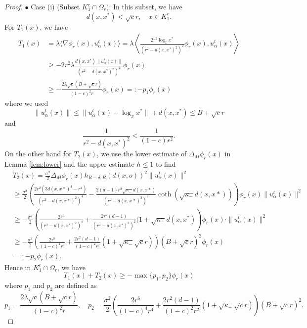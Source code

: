 \documentclass[10pt,a4paper]{amsart}
\newcommand{\dist}{d}%
\newcommand{\p}{o}%
\begin{document}
\begin{proof}
\noindent $\bullet$ Case (i) (Subset $K_1^c \cap \Omega_r)$: In this subset, we have
\[
d(x,x^*)<\sqrt c r,\quad x\in K_1^c.
\]
For $T_1(x)$, we have
\begin{align*}
T_1(x)  & =  \lambda   \langle  \nabla \phi_r(x), u_\alpha^t(x) \rangle = \lambda \left\langle  \frac{2r^2 \log_xx^*}{ (r^2- d(x,x^*)^2)^2} \phi_r(x), u_\alpha^t(x)\right\rangle \\
& \geq -2r^2 \lambda \frac{  d(x,x^*) \|u_\alpha^t(x)\|      } {      (r^2- d(x,x^*)^2)^2   }  \phi_r(x)   \\
& \geq -\frac{ 2\lambda\sqrt c (B+\sqrt cr)}{(1-c)^2r} \phi_r(x) =: -p_1 \phi_r(x)
\end{align*}
where we used
\[
\|u_\alpha^t(x) \| \leq \| u_\alpha^t(x) - \log_xx^*\| + d(x,x^*) \leq B + \sqrt cr
\]
and
\[
\frac{1}{ r^2- d(x,x^*)^2  } <\frac{1}{(1-c)r^2}.
\]
On the other hand for $T_2(x)$,  we use the lower estimate of $\Delta_M \phi_r(x)$ in Lemma \ref{lem:lower} and the upper estimate  $h\leq1$ to find
\begin{align*}
&T_2(x)  = \frac{\sigma^2}{2}\Delta_M \phi_r(x)  h_{R-\delta,R}\left(\dist(x, \p)\right)^2 \|u_\alpha^t(x)\|^2 \\
& \geq \frac{\sigma^2}{2} \left(  \frac{2r^2(3d(x,x*)^4 - r^4)}{(r^2 - d(x,x*)^2)^4} - \frac{   2(d-1)r^2\sqrt{\kappa_-}d(x,x*)  }{(r^2 - d(x,x*)^2)^2}  \coth(\sqrt{\kappa_-} d(x,x*))\right) \phi_r(x) \|u_\alpha^t(x)\|^2 \\
&\geq -\frac{\sigma^2}{2}  \left(  \frac{2r^6}{ (r^2 - d(x,x^*)^2)^4} + \frac{2r^2 (d-1)}{ (r^2 - d(x,x^*)^2)^2} (1+\sqrt{\kappa_-}d(x,x^*)     \right) \phi_r(x) \cdot   \|u_\alpha^t(x)\|^2 \\
& \geq -\frac{\sigma^2}{2} \left(   \frac{2r^6}{(1-c)^4r^4}  + \frac{2r^2(d-1)}{(1-c)^2 r^2}(1+\sqrt{\kappa_-}\sqrt cr)     \right)   (B+\sqrt cr)^2 \phi_r(x) \\
& = : -p_2\phi_r(x).
\end{align*}
Hence in $K_1^c \cap \Omega_r$, we have
\[
T_1(x) + T_2(x) \geq -\max \{p_1,p_2\}\phi_r(x)
\]
where $p_1$ and $p_2$ are defined as
\begin{equation} \label{p1p2}
p_1= \frac{ 2\lambda\sqrt c (B+\sqrt cr)}{(1-c)^2r},\quad p_2 = \frac{\sigma^2}{2} \left(   \frac{2r^6}{(1-c)^4r^4}  + \frac{2r^2(d-1)}{(1-c)^2 r^2}(1+\sqrt{\kappa_-}\sqrt cr)     \right)   (B+\sqrt cr)^2 .
\end{equation}

\vspace{0.3cm}



\end{proof}
\end{document}
